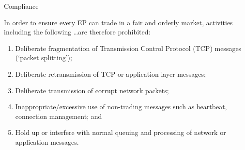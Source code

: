 \documentclass{beamer}
\begin{document}
\begin{frame}{Compliance}
	\begin{block}{}
		In order to ensure every EP can trade in a fair and orderly market, activities including the following \ldots are therefore prohibited:
		\begin{enumerate}
			\item Deliberate fragmentation of Transmission Control Protocol (TCP) messages (‘packet splitting’);
			\item Deliberate retransmission of TCP or application layer messages;
			\item Deliberate transmission of corrupt network packets;
			\item Inappropriate/excessive use of non-trading messages such as heartbeat, connection management; and
			\item Hold up or interfere with normal queuing and processing of network or application messages.
		\end{enumerate}
	\end{block}
\end{frame}
\end{document}
